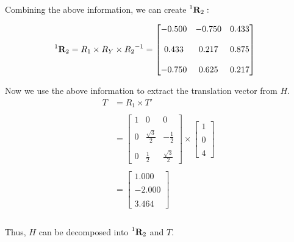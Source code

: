 \documentclass[12pt, oneside]{article}
\begin{document}
Combining the above information, we can create $ \prescript{1}{}{\mathbf{R}_2}:$

\begin{align*}
    & \prescript{1}{}{\mathbf{R}_2} 
    =  R_1 \times R_Y \times {R_2}^{-1}
    = \begin{bmatrix} -0.500  & -0.750 & 0.433 \\ \\ 
                    0.433   & 0.217 & 0.875 \\ \\ 
                    -0.750   & 0.625 & 0.217 \end{bmatrix} 
\end{align*}

Now we use the above information to extract the translation vector from $H$.
\begin{align*}
    T   &= R_1 \times T' \\ \\
        &=  \begin{bmatrix} 1 & 0 & 0 \\ \\ 
            0 & \frac{\sqrt{3}}{2} & -\frac{1}{2}\\ \\ 
            0 & \frac{1}{2} & \frac{\sqrt{3}}{2} \end{bmatrix}  \times
            \begin{bmatrix} 1  \\ \\ 
                0 \\ \\ 
                4 \end{bmatrix}  \\ \\
        &=  \begin{bmatrix} 1.000  \\ \\ 
                -2.000 \\ \\ 
                3.464 \end{bmatrix}  \\ \\
\end{align*}

Thus, $H$ can be decomposed into  $ \prescript{1}{}{\mathbf{R}_2}$ and $T$.

\end{document}
